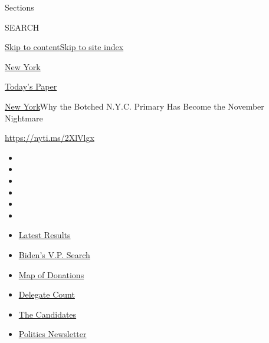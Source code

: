 Sections

SEARCH

\protect\hyperlink{site-content}{Skip to
content}\protect\hyperlink{site-index}{Skip to site index}

\href{https://www.nytimes3xbfgragh.onion/section/nyregion}{New York}

\href{https://myaccount.nytimes3xbfgragh.onion/auth/login?response_type=cookie\&client_id=vi}{}

\href{https://www.nytimes3xbfgragh.onion/section/todayspaper}{Today's
Paper}

\href{/section/nyregion}{New York}\textbar{}Why the Botched N.Y.C.
Primary Has Become the November Nightmare

\href{https://nyti.ms/2XlVlgx}{https://nyti.ms/2XlVlgx}

\begin{itemize}
\item
\item
\item
\item
\item
\item
\end{itemize}

\begin{itemize}
\item
  \href{https://www.nytimes3xbfgragh.onion/interactive/2020/08/04/us/elections/results-arizona-kansas-michigan-missouri-primaries.html?action=click\&pgtype=Article\&state=default\&region=TOP_BANNER\&context=storylines_menu}{Latest
  Results}
\item
  \href{https://www.nytimes3xbfgragh.onion/article/biden-vice-president-2020.html?action=click\&pgtype=Article\&state=default\&region=TOP_BANNER\&context=storylines_menu}{Biden's
  V.P. Search}
\item
  \href{https://www.nytimes3xbfgragh.onion/interactive/2020/07/24/us/politics/trump-biden-campaign-donors.html?action=click\&pgtype=Article\&state=default\&region=TOP_BANNER\&context=storylines_menu}{Map
  of Donations}
\item
  \href{https://www.nytimes3xbfgragh.onion/interactive/2020/us/elections/delegate-count-primary-results.html?action=click\&pgtype=Article\&state=default\&region=TOP_BANNER\&context=storylines_menu}{Delegate
  Count}
\item
  \href{https://www.nytimes3xbfgragh.onion/interactive/2019/us/politics/2020-presidential-candidates.html?action=click\&pgtype=Article\&state=default\&region=TOP_BANNER\&context=storylines_menu}{The
  Candidates}
\item
  \href{https://www.nytimes3xbfgragh.onion/newsletters/politics?action=click\&pgtype=Article\&state=default\&region=TOP_BANNER\&context=storylines_menu}{Politics
  Newsletter}
\end{itemize}

